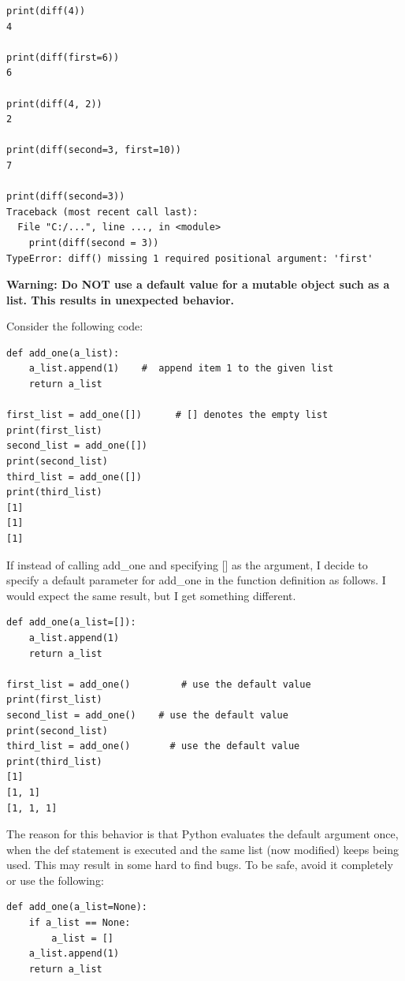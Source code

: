 \documentclass{article}
\begin{document}
\begin{lstlisting}
print(diff(4))
4
 
print(diff(first=6))
6
 
print(diff(4, 2))
2
 
print(diff(second=3, first=10))
7
 
print(diff(second=3))
Traceback (most recent call last):
  File "C:/...", line ..., in <module>
    print(diff(second = 3))
TypeError: diff() missing 1 required positional argument: 'first'
\end{lstlisting}
 
\textbf{Warning:
Do NOT use a default value for a mutable object such as a list.  This results in unexpected behavior.}

Consider the following code:

\begin{lstlisting}
def add_one(a_list):
    a_list.append(1)    #  append item 1 to the given list
    return a_list
 
first_list = add_one([])      # [] denotes the empty list
print(first_list)
second_list = add_one([])
print(second_list)
third_list = add_one([])
print(third_list)
[1]
[1]
[1]
\end{lstlisting}

If instead of calling add{\_}one and specifying [] as the argument, I decide to specify a default parameter for add{\_}one in the function definition as follows. I would expect the same result, but I get something different.

\begin{lstlisting}
def add_one(a_list=[]):
    a_list.append(1)
    return a_list
 
first_list = add_one()         # use the default value
print(first_list)
second_list = add_one()    # use the default value
print(second_list)
third_list = add_one()       # use the default value
print(third_list)
[1]
[1, 1]
[1, 1, 1]
\end{lstlisting}

The reason for this behavior is that Python evaluates the default argument once, when the def statement is executed  and the same list (now modified) keeps being used.  This may result in some hard to find bugs.
To be safe, avoid it completely or use the following: 

\begin{lstlisting}
def add_one(a_list=None):
    if a_list == None:
        a_list = []
    a_list.append(1)
    return a_list
\end{lstlisting}
 
\end{document}
